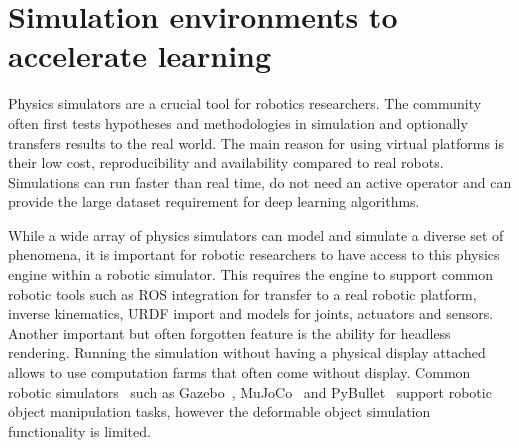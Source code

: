 \documentclass[\home/main.tex]{subfiles}
\begin{document}

\section{Simulation environments to accelerate learning} \label{sec:lit_simulation}


Physics simulators are a crucial tool for robotics researchers. The community often first tests hypotheses and methodologies in simulation and optionally transfers results to the real world. The main reason for using virtual platforms is their low cost, reproducibility and availability compared to real robots. Simulations can run faster than real time, do not need an active operator and can provide the large dataset requirement for deep learning algorithms.

While a wide array of physics simulators can model and simulate a diverse set of phenomena, it is important for robotic researchers to have access to this physics engine within a robotic simulator. This requires the engine to support common robotic tools such as ROS integration for transfer to a real robotic platform, inverse kinematics, URDF import and models for joints, actuators and sensors. Another important but often forgotten feature is the ability for headless rendering. Running the simulation without having a physical display attached allows to use computation farms that often come without display. Common robotic simulators~\autocite{review paper robotic simulators} such as Gazebo~\autocite{gazebo}, MuJoCo~\autocite{mujoco} and PyBullet~\autocite{pybullet} support robotic object manipulation tasks, however the deformable object simulation functionality is limited.
\end{document}
